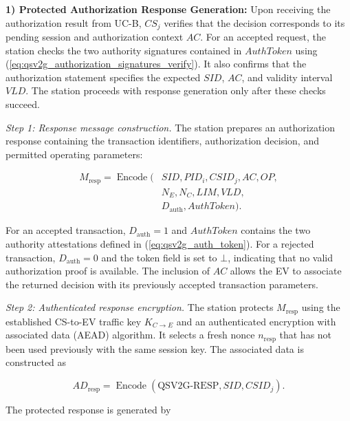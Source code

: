 \documentclass[twocolumn,10pt,journal]{IEEEtran}
\begin{document}
\noindent\textbf{1) Protected Authorization Response Generation:}
Upon receiving the authorization result from UC-B,
$CS_j$ verifies that the decision corresponds to its
pending session and authorization context $AC$.
For an accepted request, the station checks the two
authority signatures contained in $AuthToken$ using
(\ref{eq:qsv2g_authorization_signatures_verify}).
It also confirms that the authorization statement
specifies the expected $SID$, $AC$, and validity
interval $VLD$. The station proceeds with response
generation only after these checks succeed.

\textit{Step 1: Response message construction.}
The station prepares an authorization response
containing the transaction identifiers, authorization
decision, and permitted operating parameters:

\begin{equation}
\begin{aligned}
M_{\mathrm{resp}} =
\operatorname{Encode}\big(
&SID,PID_i,CSID_j,AC,OP,\\
&N_E,N_C,LIM,VLD,\\
&D_{\mathrm{auth}},AuthToken
\big).
\end{aligned}
\label{eq:qsv2g_response_message}
\end{equation}

For an accepted transaction, $D_{\mathrm{auth}}=1$
and $AuthToken$ contains the two authority
attestations defined in (\ref{eq:qsv2g_auth_token}).
For a rejected transaction, $D_{\mathrm{auth}}=0$
and the token field is set to $\bot$, indicating
that no valid authorization proof is available.
The inclusion of $AC$ allows the EV to associate
the returned decision with its previously
accepted transaction parameters.

\textit{Step 2: Authenticated response encryption.}
The station protects $M_{\mathrm{resp}}$ using
the established CS-to-EV traffic key $K_{C\to E}$ and
an authenticated encryption with associated
data (AEAD) algorithm. It selects a fresh
nonce $n_{\mathrm{resp}}$ that has not been
used previously with the same session key.
The associated data is constructed as

\begin{equation}
AD_{\mathrm{resp}} =
\operatorname{Encode}
\left(
\mathrm{QSV2G\mbox{-}RESP},
SID,CSID_j
\right).
\label{eq:qsv2g_response_ad}
\end{equation}

The protected response is generated by
\end{document}
